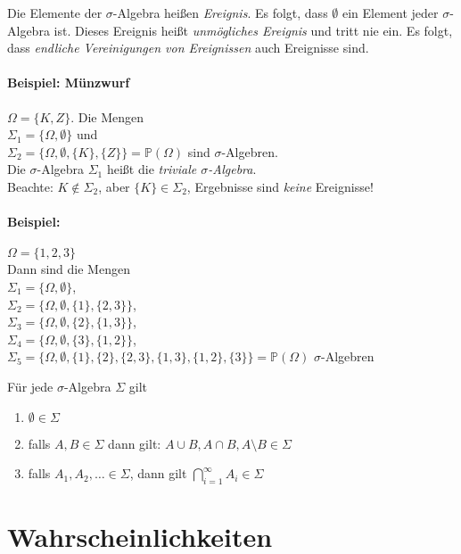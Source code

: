 Die Elemente der $\sigma$-Algebra heißen \emph{Ereignis}.
Es folgt, dass $\emptyset$ ein Element jeder $\sigma$-Algebra ist. Dieses Ereignis heißt
\emph{unmögliches Ereignis} und tritt nie ein.
Es folgt, dass \emph{endliche Vereinigungen von Ereignissen} auch Ereignisse sind.

\paragraph{Beispiel: Münzwurf}
$\Omega = \{K, Z\}$. Die Mengen\\
$\Sigma_1=\{\Omega, \emptyset\}$ und\\
$\Sigma_2=\{\Omega, \emptyset, \{K\}, \{Z\}\} = \mathbb{P}(\Omega)$ sind $\sigma$-Algebren.\\
Die $\sigma$-Algebra $\Sigma_1$ heißt die \emph{triviale $\sigma$-Algebra}.\\
Beachte: $K \notin \Sigma_2$, aber $\{K\} \in \Sigma_2$, Ergebnisse sind \emph{keine} Ereignisse!

\paragraph{Beispiel:} $\Omega = \{1,2,3\}$\\
Dann sind die Mengen\\
$\Sigma_1 = \{\Omega, \emptyset\}$,\\
$\Sigma_2 = \{\Omega, \emptyset, \{1\}, \{2,3\}\}$,\\
$\Sigma_3 = \{\Omega, \emptyset, \{2\}, \{1,3\}\}$,\\
$\Sigma_4 = \{\Omega, \emptyset, \{3\}, \{1,2\}\}$,\\
$\Sigma_5 = \{\Omega, \emptyset, \{1\}, \{2\}, \{2,3\}, \{1,3\}, \{1,2\}, \{3\} \} = \mathbb{P}(\Omega)$
$\sigma$-Algebren

\begin{theorem}
    Für jede $\sigma$-Algebra $\Sigma$ gilt
    \begin{enumerate}
        \item $\emptyset \in \Sigma$
        \item falls $A, B \in \Sigma$ dann gilt: $A \cup B, A \cap B, A \setminus B \in \Sigma$
        \item falls $A_1,A_2,\dots \in \Sigma$, dann gilt $\bigcap\limits_{i=1}^\infty A_i \in \Sigma$
    \end{enumerate}
\end{theorem}

\section{Wahrscheinlichkeiten}

